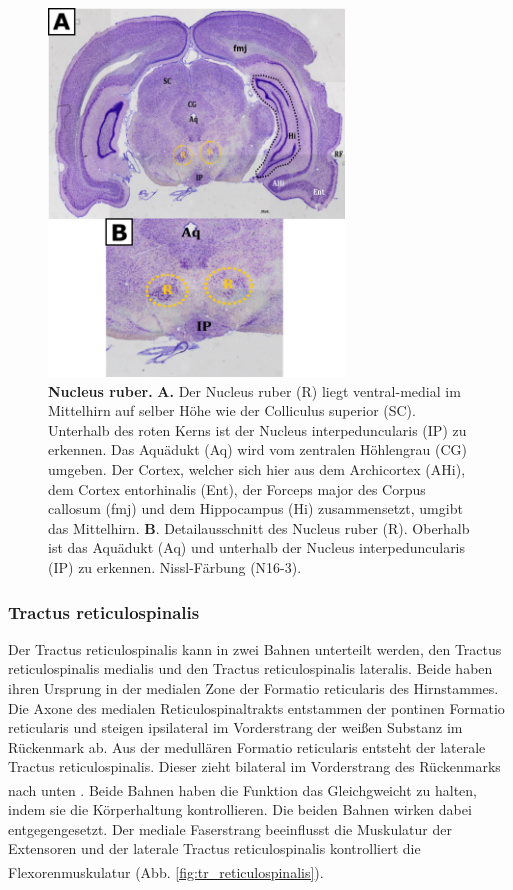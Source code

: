 \documentclass[12pt,a4paper,pdftex]{article}
\begin{document}
\begin{figure}[H]
    \centering
    \includegraphics[width=0.7\textwidth]{pictures/Bilder_Laura/red_nucleus_N16_3P_025x.png}
    \caption[Nucleus ruber]{\textbf{Nucleus ruber.} \textbf{A.} Der Nucleus ruber (R) liegt ventral-medial im Mittelhirn auf selber Höhe wie der Colliculus superior (SC). Unterhalb des roten Kerns ist der Nucleus interpeduncularis (IP) zu erkennen. Das Aquädukt (Aq) wird vom zentralen Höhlengrau (CG) umgeben. Der Cortex, welcher sich hier aus dem  Archicortex (AHi), dem Cortex entorhinalis (Ent), der Forceps major des Corpus callosum (fmj) und dem Hippocampus (Hi) zusammensetzt, umgibt das Mittelhirn. \textbf{B}. Detailausschnitt des Nucleus ruber (R). Oberhalb ist das Aquädukt (Aq) und unterhalb der Nucleus interpeduncularis (IP) zu erkennen. Nissl-Färbung (N16-3).}
    \label{fig:roter_Kern}
\end{figure}

\subsubsection{Tractus reticulospinalis} 
Der Tractus reticulospinalis kann in zwei Bahnen unterteilt werden, den Tractus reticulospinalis medialis und den Tractus reticulospinalis lateralis. Beide haben ihren Ursprung in der medialen Zone der Formatio reticularis des Hirnstammes. Die Axone des medialen Reticulospinaltrakts entstammen der pontinen Formatio reticularis und steigen ipsilateral im Vorderstrang der weißen Substanz im Rückenmark ab. Aus der medullären Formatio reticularis entsteht der laterale Tractus reticulospinalis. Dieser zieht bilateral im Vorderstrang des Rückenmarks nach unten \textsuperscript{\cite[8]{crossman2014neuroanatomy}}. Beide Bahnen haben die Funktion das Gleichgweicht zu halten, indem sie die Körperhaltung kontrollieren. Die beiden Bahnen wirken dabei entgegengesetzt. Der mediale Faserstrang beeinflusst die Muskulatur der Extensoren und der laterale Tractus reticulospinalis kontrolliert die Flexorenmuskulatur \textsuperscript{\cite[14]{neurowissenschaften_baer}}(Abb. \ref{fig:tr_reticulospinalis}).
\end{document}
